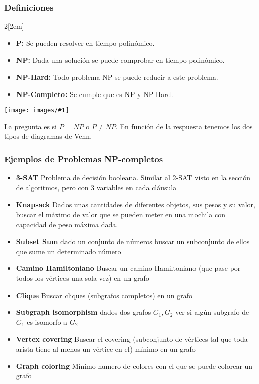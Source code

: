\documentclass[leqno]{article}
\newcommand{\incimg}[1]{%
\texttt{[image: images/\#1]}
}
\begin{document}
\subsubsection{Definiciones}
\begin{multicols}{2}[\columnsep2em]
\begin{itemize}
  \item \textbf{P:} Se pueden resolver en tiempo polinómico.
  \item \textbf{NP:} Dada una solución se puede comprobar en tiempo polinómico.
  \item \textbf{NP-Hard:} Todo problema NP se puede reducir a este problema.
  \item \textbf{NP-Completo:} Se cumple que es NP y NP-Hard.
\end{itemize}
\columnbreak
\incimg{PNP.png}
\end{multicols}
\noindent
La pregunta es si $P=NP$ o  $P\neq NP$. En función de la respuesta tenemos los dos tipos de diagramas de Venn.

\subsubsection{Ejemplos de Problemas NP-completos}
\begin{itemize}
  \item \textbf{3-SAT} Problema de decisión booleana. Similar al 2-SAT visto en la sección de algoritmos, pero con 3 variables en cada cláusula
  \item \textbf{Knapsack} Dados unas cantidades de diferentes objetos, sus pesos y su valor, buscar el máximo de valor que se pueden meter en una mochila con capacidad de peso máxima dada.
  \item \textbf{Subset Sum} dado un conjunto de números buscar un subconjunto de ellos que sume un determinado número
  \item \textbf{Camino Hamiltoniano} Buscar un camino Hamiltoniano (que pase por todos los vértices una sola vez) en un grafo
  \item \textbf{Clique} Buscar cliques (subgrafos completos) en un grafo
  \item \textbf{Subgraph isomorphism} dados dos grafos $G_1, G_2$ ver si algún subgrafo de $G_1$ es isomorfo a $G_2$
  \item \textbf{Vertex covering} Buscar el covering (subconjunto de vértices tal que toda arista tiene al menos un vértice en el) mínimo en un grafo
  \item \textbf{Graph coloring} Mínimo numero de colores con el que se puede colorear un grafo
\end{itemize}
\end{document}
